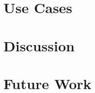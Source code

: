 \documentclass[conference]{IEEEtran}
\begin{document}
\section{Use Cases}
\label{sec:usecases}


\section{Discussion}
\label{sec:discussion}


\section{Future Work}
\label{sec:future}





\end{document}
